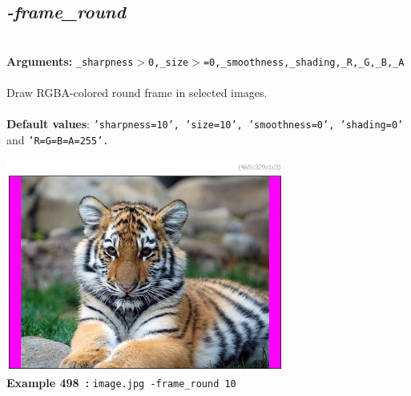 \documentclass[a4paper,11pt,twoside]{book}
\begin{document}
\subsection{\emph{-frame\_round} }\vspace*{-0.5em}
~\\\textbf{Arguments: } 
{\small \texttt{\_sharpness$>$0,\_size$>$=0,\_smoothness,\_shading,\_R,\_G,\_B,\_A}}\\~\\
Draw RGBA-colored round frame in selected images.
~\\~\\\textbf{Default values}: {\small \texttt{'sharpness=10', 'size=10', 'smoothness=0', 'shading=0'} and \texttt{'R=G=B=A=255'.}}
\begin{center}\includegraphics[keepaspectratio=true,height=7cm,width=\textwidth]{img/gmic_def498.jpg}\\
{\footnotesize \textbf{Example 498~:} \texttt{image.jpg -frame\_round 10}}
\end{center}
\end{document}
